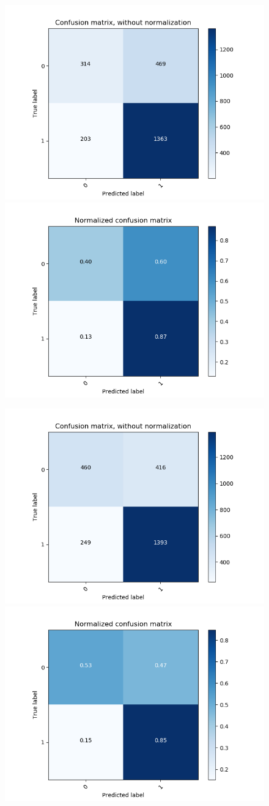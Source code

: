 \begin{figure}[H]
	\centering
	
	\begin{minipage}[b]{\columnwidth}
		\centering
		\includegraphics[clip, width=0.45\linewidth]{fig/chapter4/count_pretrain_False_he_False}
		\includegraphics[clip, width=0.45\linewidth]{fig/chapter4/pretrain_False_he_False}
		\label{fig:no_preprocess}
	\end{minipage}

	\begin{minipage}[b]{\columnwidth}
		\centering
		\includegraphics[clip, width=0.45\linewidth]{fig/chapter4/count_pretrain_False_he_True}
		\includegraphics[clip, width=0.45\linewidth]{fig/chapter4/pretrain_False_he_True}
		\label{fig:he_preprocess}
	\end{minipage}


\end{figure}
